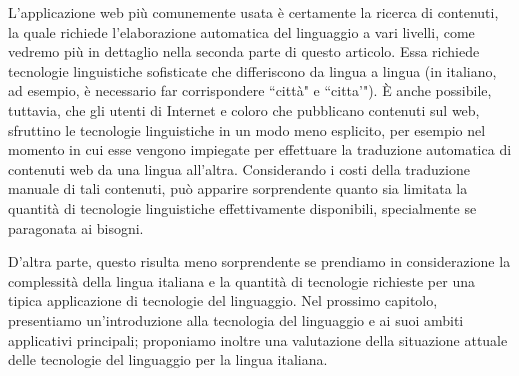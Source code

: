 \documentclass[]{../../metanetpaper}
\begin{document}
\begin{multicols}{2}
L'applicazione web pi\`{u} comunemente usata \`{e} certamente la ricerca di
contenuti, la quale richiede l'elaborazione automatica del linguaggio a vari
livelli, come vedremo pi\`{u} in dettaglio nella seconda parte di questo
articolo. Essa richiede tecnologie linguistiche sofisticate che differiscono
da lingua a lingua (in italiano, ad esempio, \`{e} necessario far
corrispondere “citt\`{a}" e “citta'"). \`{E} anche possibile, tuttavia, che
gli utenti di Internet e coloro che pubblicano contenuti sul web, sfruttino le
tecnologie linguistiche in un modo meno esplicito, per esempio nel momento in
cui esse vengono impiegate per effettuare la traduzione automatica di
contenuti web da una lingua all'altra. Considerando i costi della traduzione
manuale di tali contenuti, pu\`{o} apparire sorprendente quanto sia limitata
la quantit\`{a} di tecnologie linguistiche effettivamente disponibili,
specialmente se paragonata ai bisogni.

D'altra parte, questo risulta meno sorprendente se prendiamo in considerazione
la complessit\`{a} della lingua italiana e la quantit\`{a} di tecnologie
richieste per una tipica applicazione di tecnologie del linguaggio. Nel
prossimo capitolo, presentiamo un'introduzione alla tecnologia del linguaggio
e ai suoi ambiti applicativi principali; proponiamo inoltre una valutazione
della situazione attuale delle tecnologie del linguaggio per la lingua
italiana.



\end{multicols}

\clearpage




\end{document}
